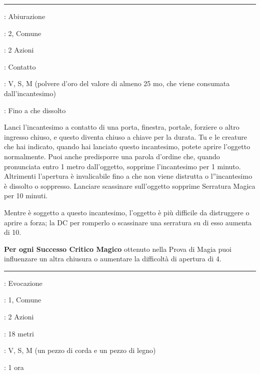 \begin{multicols}{2}
\smallskip\noindent\rule{\linewidth}{2pt} \hypertarget{Serratura Magica}{}\medskip{}\label{Arcane Lock}
\noindent
\begin{description}[noitemsep, topsep=0pt, parsep=0pt, partopsep=0pt, leftmargin=0cm, labelwidth=2.8cm]
	\item[\textbf{Lista di Magia}]: Abiurazione
	\item[\textbf{Livello}]: 2, Comune
	\item[\textbf{T. di Lancio}]: 2 Azioni
	\item[\textbf{Gittata}]: Contatto
	\item[\textbf{Componenti}]: V, S, M (polvere d'oro del valore di almeno 25 mo, che viene consumata dall'incantesimo)
	\item[\textbf{Durata}]: Fino a che dissolto
\end{description}

Lanci l'incantesimo a contatto di una porta, finestra, portale, forziere o altro ingresso chiuso, e questo diventa chiuso a chiave per la durata. Tu e le creature che hai indicato, quando hai lanciato questo incantesimo, potete aprire l'oggetto normalmente. Puoi anche predisporre una parola d'ordine che, quando pronunciata entro 1 metro dall'oggetto, sopprime l'incantesimo per 1 minuto. Altrimenti l'apertura è invalicabile fino a che non viene distrutta o l''incantesimo è dissolto o soppresso. Lanciare scassinare sull'oggetto sopprime Serratura Magica per 10 minuti.

Mentre è soggetto a questo incantesimo, l'oggetto è più difficile da distruggere o aprire a forza; la DC per romperlo o scassinare una serratura su di esso aumenta di 10.

\textbf{Per ogni Successo Critico Magico} ottenuto nella Prova di Magia puoi influenzare un altra chiusura o aumentare la difficoltà di apertura di 4.

\smallskip\noindent\rule{\linewidth}{2pt} \hypertarget{Servitore Invisibile}{}\medskip{}
\noindent
\begin{description}[noitemsep, topsep=0pt, parsep=0pt, partopsep=0pt, leftmargin=0cm, labelwidth=2.8cm]
	\item[\textbf{Lista di Magia}]: Evocazione
	\item[\textbf{Livello}]: 1, Comune
	\item[\textbf{T. di Lancio}]: 2 Azioni
	\item[\textbf{Gittata}]: 18 metri
	\item[\textbf{Componenti}]: V, S, M (un pezzo di corda e un pezzo di legno)
	\item[\textbf{Durata}]: 1 ora
\end{description}


\end{multicols}
